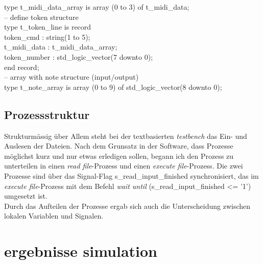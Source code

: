 \smallskip
type t\_midi\_data\_array is array (0 to 3) of t\_midi\_data;\\

-- define token structure\\
type t\_token\_line is record\\
\hspace*{12mm}        token\_cmd : string(1 to 5);\\
\hspace*{12mm}        t\_midi\_data : t\_midi\_data\_array;\\
\hspace*{12mm}        token\_number : std\_logic\_vector(7 downto 0);\\
\hspace*{12mm}    end record;\\


        
-- array with note structure (input/output)     \\
type t\_note\_array is array (0 to 9) of std\_logic\_vector(8 downto 0);\\

\subsection*{Prozessstruktur}
Strukturmässig über Allem steht bei der textbasierten \textit{testbench} das Ein- und Auslesen der Dateien. Nach dem Grunsatz in der Software, dass Prozesse möglichst kurz und nur etwas erledigen sollen, begann ich den Prozess zu unterteilen in einen \textit{read file}-Prozess und einen \textit{execute file}-Prozess. Die zwei Prozesse sind über das Signal-Flag s\_read\_input\_finished synchronisiert, das im \textit{execute file}-Prozess mit dem Befehl \textit{wait until} (s_read_input_finished <= '1') umgesetzt ist.\\

Durch das Aufteilen der Prozesse ergab sich auch die Unterscheidung zwischen lokalen Variablen und Signalen.

\section{ergebnisse simulation}\label{sec.ergebnisse_tests}


